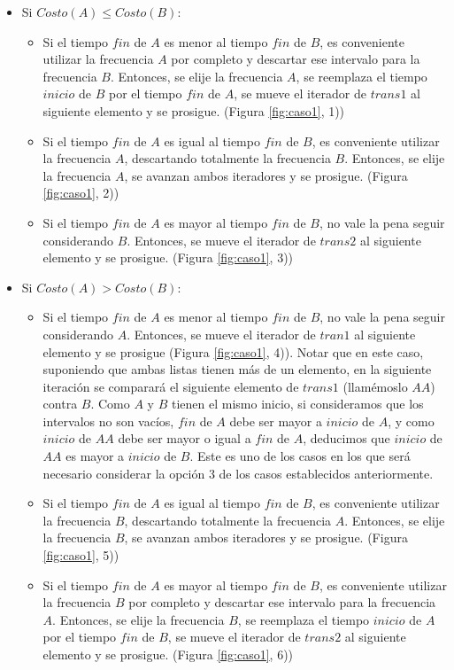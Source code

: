 \begin{itemize}
\item Si $Costo(A) \leq Costo(B)$:
	\begin{itemize}
	\item Si el tiempo $fin$ de $A$ es menor al tiempo $fin$ de $B$, es conveniente utilizar la frecuencia $A$ por completo y descartar ese intervalo para la frecuencia $B$. Entonces, se elije la frecuencia $A$, se reemplaza el tiempo $inicio$ de $B$ por el tiempo $fin$ de $A$, se mueve el iterador de $trans1$ al siguiente elemento y se prosigue. (Figura \ref{fig:caso1}, 1))
	\item Si el tiempo $fin$ de $A$ es igual al tiempo $fin$ de $B$, es conveniente utilizar la frecuencia $A$, descartando totalmente la frecuencia $B$.  Entonces, se elije la frecuencia $A$, se avanzan ambos iteradores y se prosigue. (Figura \ref{fig:caso1}, 2))
	\item Si el tiempo $fin$ de $A$ es mayor al tiempo $fin$ de $B$, no vale la pena seguir considerando $B$. Entonces, se mueve el iterador de $trans2$ al siguiente elemento y se prosigue. (Figura \ref{fig:caso1}, 3))
	\end{itemize}
\item Si $Costo(A) > Costo(B)$:
	\begin{itemize}
	\item Si el tiempo $fin$ de $A$ es menor al tiempo $fin$ de $B$, no vale la pena seguir considerando $A$. Entonces, se mueve el iterador de $tran1$ al siguiente elemento y se prosigue (Figura \ref{fig:caso1}, 4)). Notar que en este caso, suponiendo que ambas listas tienen más de un elemento, en la siguiente iteración se comparará el siguiente elemento de $trans1$ (llamémoslo $AA$) contra $B$.  Como $A$ y $B$ tienen el mismo inicio, si consideramos que los intervalos no son vacíos, $fin$ de $A$ debe ser mayor a $inicio$ de $A$, y como $inicio$ de $AA$ debe ser mayor o igual a $fin$ de $A$, deducimos que $inicio$ de $AA$ es mayor a $inicio$ de $B$.  Este es uno de los casos en los que será necesario considerar la opción 3 de los casos establecidos anteriormente.
	\item Si el tiempo $fin$ de $A$ es igual al tiempo $fin$ de $B$, es conveniente utilizar la frecuencia $B$, descartando totalmente la frecuencia $A$.  Entonces, se elije la frecuencia $B$, se avanzan ambos iteradores y se prosigue. (Figura \ref{fig:caso1}, 5))
	\item Si el tiempo $fin$ de $A$ es mayor al tiempo $fin$ de $B$, es conveniente utilizar la frecuencia $B$ por completo y descartar ese intervalo para la frecuencia $A$. Entonces, se elije la frecuencia $B$, se reemplaza el tiempo $inicio$ de $A$ por el tiempo $fin$ de $B$, se mueve el iterador de $trans2$ al siguiente elemento y se prosigue. (Figura \ref{fig:caso1}, 6))
	\end{itemize}
\end{itemize}

